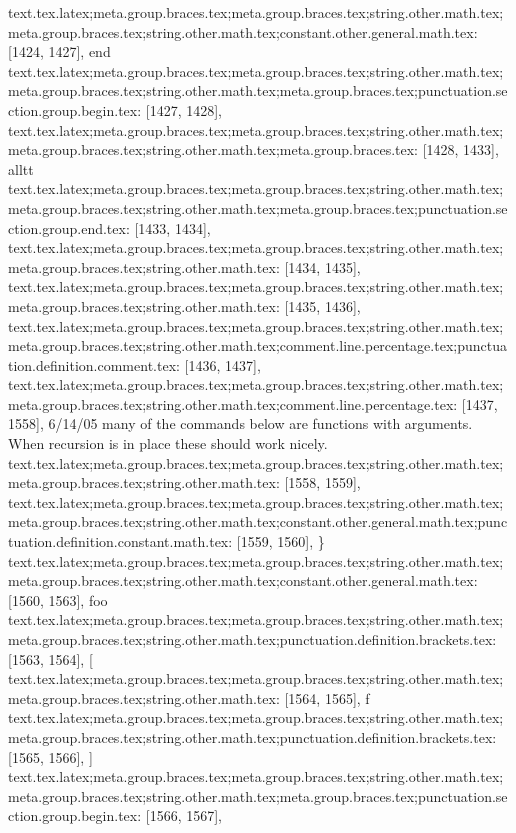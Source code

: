 {{{{{{{{{{{{{{{{{{{{{{{{{{{{{{{{{{{{{{text.tex.latex;meta.group.braces.tex;meta.group.braces.tex;string.other.math.tex;meta.group.braces.tex;string.other.math.tex;constant.other.general.math.tex: [1424, 1427], {end}
text.tex.latex;meta.group.braces.tex;meta.group.braces.tex;string.other.math.tex;meta.group.braces.tex;string.other.math.tex;meta.group.braces.tex;punctuation.section.group.begin.tex: [1427, 1428], {{}
text.tex.latex;meta.group.braces.tex;meta.group.braces.tex;string.other.math.tex;meta.group.braces.tex;string.other.math.tex;meta.group.braces.tex: [1428, 1433], {alltt}
text.tex.latex;meta.group.braces.tex;meta.group.braces.tex;string.other.math.tex;meta.group.braces.tex;string.other.math.tex;meta.group.braces.tex;punctuation.section.group.end.tex: [1433, 1434], {}}
text.tex.latex;meta.group.braces.tex;meta.group.braces.tex;string.other.math.tex;meta.group.braces.tex;string.other.math.tex: [1434, 1435], {
}
text.tex.latex;meta.group.braces.tex;meta.group.braces.tex;string.other.math.tex;meta.group.braces.tex;string.other.math.tex: [1435, 1436], {
}
text.tex.latex;meta.group.braces.tex;meta.group.braces.tex;string.other.math.tex;meta.group.braces.tex;string.other.math.tex;comment.line.percentage.tex;punctuation.definition.comment.tex: [1436, 1437], {%
text.tex.latex;meta.group.braces.tex;meta.group.braces.tex;string.other.math.tex;meta.group.braces.tex;string.other.math.tex;comment.line.percentage.tex: [1437, 1558], { 6/14/05  many of the commands below are functions with arguments.  When recursion is in place these should work nicely.
}
text.tex.latex;meta.group.braces.tex;meta.group.braces.tex;string.other.math.tex;meta.group.braces.tex;string.other.math.tex: [1558, 1559], {
}
text.tex.latex;meta.group.braces.tex;meta.group.braces.tex;string.other.math.tex;meta.group.braces.tex;string.other.math.tex;constant.other.general.math.tex;punctuation.definition.constant.math.tex: [1559, 1560], {\}
text.tex.latex;meta.group.braces.tex;meta.group.braces.tex;string.other.math.tex;meta.group.braces.tex;string.other.math.tex;constant.other.general.math.tex: [1560, 1563], {foo}
text.tex.latex;meta.group.braces.tex;meta.group.braces.tex;string.other.math.tex;meta.group.braces.tex;string.other.math.tex;punctuation.definition.brackets.tex: [1563, 1564], {[}
text.tex.latex;meta.group.braces.tex;meta.group.braces.tex;string.other.math.tex;meta.group.braces.tex;string.other.math.tex: [1564, 1565], {f}
text.tex.latex;meta.group.braces.tex;meta.group.braces.tex;string.other.math.tex;meta.group.braces.tex;string.other.math.tex;punctuation.definition.brackets.tex: [1565, 1566], {]}
text.tex.latex;meta.group.braces.tex;meta.group.braces.tex;string.other.math.tex;meta.group.braces.tex;string.other.math.tex;meta.group.braces.tex;punctuation.section.group.begin.tex: [1566, 1567], {{}
}}}}}}}}}}}}}}}}}}}}}}}}}}}}}}}}}}}}}}}}}
